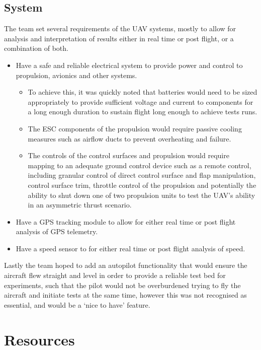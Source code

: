 \documentclass[../../main.tex]{subfiles}
\begin{document}
\subsection{System} \label{sec:design-specification:requirements:system}

The team set several requirements of the UAV systems, mostly to allow for analysis and interpretation of results either in real time or post flight, or a combination of both. 

\begin{itemize}
    \item Have a safe and reliable electrical system to provide power and control to propulsion, avionics and other systems.
        \begin{itemize}
            \item To achieve this, it was quickly noted that batteries would need to be sized appropriately to provide sufficient voltage and current to components for a long enough duration to sustain flight long enough to achieve tests runs. 
            \item The ESC components of the propulsion would require passive cooling measures such as airflow ducts to prevent overheating and failure. 
            \item The controls of the control surfaces and propulsion would require mapping to an adequate ground control device such as a remote control, including granular control of direct control surface and flap manipulation, control surface trim, throttle control of the propulsion and potentially the ability to shut down one of two propulsion units to test the UAV’s ability in an asymmetric thrust scenario. 
        \end{itemize}
    \item Have a GPS tracking module to allow for either real time or post flight analysis of GPS telemetry. 
    \item Have a speed sensor to for either real time or post flight analysis of speed. 
\end{itemize}

Lastly the team hoped to add an autopilot functionality that would ensure the aircraft flew straight and level in order to provide a reliable test bed for experiments, such that the pilot would not be overburdened trying to fly the aircraft and initiate tests at the same time, however this was not recognised as essential, and would be a ‘nice to have’ feature.

\section{Resources} \label{sec:introduction:resources}
\end{document}
